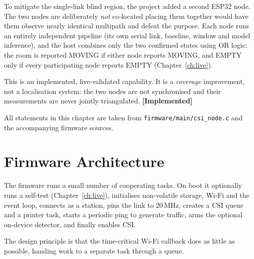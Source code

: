 \documentclass[11pt,a4paper,oneside]{report}
\newcommand{\evidencetag}[2]{{\small\sffamily\bfseries\textcolor{#1}{[#2]}}}
\newcommand{\Impl}{\evidencetag{good}{Implemented}}
\newcommand{\code}[1]{\texttt{\small #1}}
\begin{document}
To mitigate the single-link blind region, the project added a second ESP32
node. The two nodes are deliberately \emph{not} co-located placing them
together would have them observe nearly identical multipath and defeat the
purpose. Each node runs an entirely independent pipeline (its own serial link,
baseline, window and model inference), and the host combines only the two
confirmed states using OR logic: the room is reported MOVING if either node
reports MOVING, and EMPTY only if every participating node reports EMPTY
(Chapter~\ref{ch:live}).

This is an implemented, live-validated capability. It is a \emph{coverage}
improvement, not a localisation system: the two nodes are not synchronised and
their measurements are never jointly triangulated. \Impl


\label{ch:fw}

All statements in this chapter are taken from
\code{firmware/main/csi\_node.c} and the accompanying firmware sources.

\section{Firmware Architecture}

The firmware runs a small number of cooperating tasks. On boot it optionally
runs a self-test (Chapter~\ref{ch:live}), initialises non-volatile storage,
Wi-Fi and the event loop, connects as a station, pins the link to 20\,MHz,
creates a CSI queue and a printer task, starts a periodic ping to generate
traffic, arms the optional on-device detector, and finally enables CSI.

The design principle is that the time-critical Wi-Fi callback does as little as
possible, handing work to a separate task through a queue.
\end{document}
